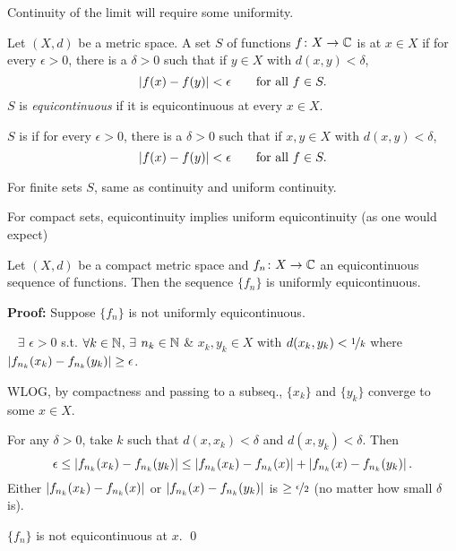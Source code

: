 \documentclass[10pt,aspectratio=169]{beamer}
\begin{document}
\begin{frame}
Continuity of the limit will require some uniformity.
\pause

\begin{definition}
Let $(X,d)$ be a metric space.
A set $S$ of functions
$f \colon X \to {\mathbb{C}}$ is
\emph{} at $x \in X$
if for every $\epsilon > 0$, there is a $\delta > 0$
such that if $y \in X$ with $d(x,y) < \delta$,
\begin{equation*}
\lvert {f(x)-f(y)} \rvert < \epsilon \qquad \text{for all } f \in S .
\end{equation*}
$S$ is \emph{equicontinuous} if it is equicontinuous at every $x \in X$.

\pause
\medskip

$S$ is 
\emph{}
if for every $\epsilon > 0$, there is a $\delta > 0$
such that if $x,y \in X$ with $d(x,y) < \delta$,
\begin{equation*}
\lvert {f(x)-f(y)} \rvert < \epsilon \qquad \text{for all } f \in S .
\end{equation*}
\end{definition}

\medskip
\pause

For finite sets $S$, same as continuity and uniform continuity.
\end{frame}

\begin{frame}

For compact sets, equicontinuity implies uniform equicontinuity (as one
would expect)
\pause

\begin{proposition}
Let $(X,d)$ be a compact metric space and
$f_n \colon X \to {\mathbb{C}}$ an equicontinuous sequence of functions.
Then the sequence $\{ f_n \}$ is uniformly equicontinuous.
\end{proposition}

\pause
\textbf{Proof:}
Suppose $\{ f_n \}$ is not
uniformly equicontinuous.
\pause

\thus~
$\exists$
$\epsilon > 0$
s.t. $\forall k \in {\mathbb{N}}$,
$\exists$
$n_k \in {\mathbb{N}}$ \&
$x_k,y_k \in X$ with $d(x_k,y_k) < \nicefrac{1}{k}$
where $\lvert {f_{n_k}(x_k)-f_{n_k}(y_k)} \rvert \geq \epsilon$.

\medskip
\pause

WLOG, by compactness and passing to a subseq., $\{x_k\}$ and $\{ y_k\}$ converge
to some $x \in X$.

\medskip
\pause

For any $\delta > 0$, take $k$ such that
$d(x,x_k) < \delta$ and
$d(x,y_k) < \delta$.
\pause Then
\begin{equation*}
\epsilon \leq 
\left\lvert {f_{n_k}(x_k)-f_{n_k}(y_k)} \right\rvert
\leq
\left\lvert {f_{n_k}(x_k)-f_{n_k}(x)} \right\rvert + \left\lvert {f_{n_k}(x)-f_{n_k}(y_k)} \right\rvert .
\end{equation*}
\pause
\thus \quad
Either 
$\left\lvert {f_{n_k}(x_k)-f_{n_k}(x)} \right\rvert$ or $\left\lvert {f_{n_k}(x)-f_{n_k}(y_k)} \right\rvert$ is
$\geq \nicefrac{\epsilon}{2}$ (no matter how small $\delta$ is).

\medskip
\pause
\thus\quad $\{ f_n \}$ is not equicontinuous at $x$. \qed
\end{frame}
\end{document}
